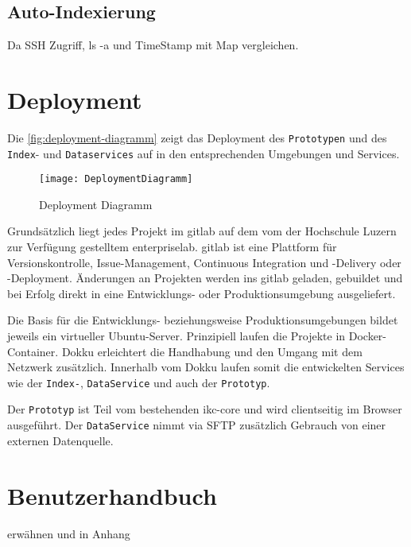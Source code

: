 \subsection{Auto-Indexierung}

Da SSH Zugriff, ls -a und TimeStamp mit Map vergleichen.

    

\section{Deployment}

Die \autoref{fig:deployment-diagramm} zeigt das Deployment des \texttt{Prototypen} und des \texttt{Index}- und \texttt{Dataservices} auf in den entsprechenden Umgebungen und Services.

    \begin{figure}[H]
    \centering
    \texttt{[image: DeploymentDiagramm]}
    \caption{Deployment Diagramm}
    \label{fig:deployment-diagramm}
    \end{figure}

Grundsätzlich liegt jedes Projekt im \gls{gitlab} auf dem vom der Hochschule Luzern zur Verfügung gestelltem \gls{enterpriselab}. \gls{gitlab} ist eine Plattform für Versionskontrolle, Issue-Management, Continuous Integration und -Delivery oder -Deployment. Änderungen an Projekten werden ins \gls{gitlab} geladen, gebuildet und bei Erfolg direkt in eine Entwicklungs- oder Produktionsumgebung ausgeliefert.

Die Basis für die Entwicklungs- beziehungsweise Produktionsumgebungen bildet jeweils ein virtueller \gls{Ubuntu}-Server.
Prinzipiell laufen die Projekte in \gls{Docker}-Container. \gls{Dokku} erleichtert die Handhabung und den Umgang mit dem Netzwerk zusätzlich. Innerhalb vom \gls{Dokku} laufen somit die entwickelten Services wie der \texttt{Index-}, \texttt{DataService} und auch der \texttt{Prototyp}. 

Der \texttt{Prototyp} ist Teil vom bestehenden \gls{ikc-core} und wird clientseitig im Browser ausgeführt. Der \texttt{DataService} nimmt via \gls{SFTP} zusätzlich Gebrauch von einer externen Datenquelle.

\section{Benutzerhandbuch}

erwähnen und in Anhang
